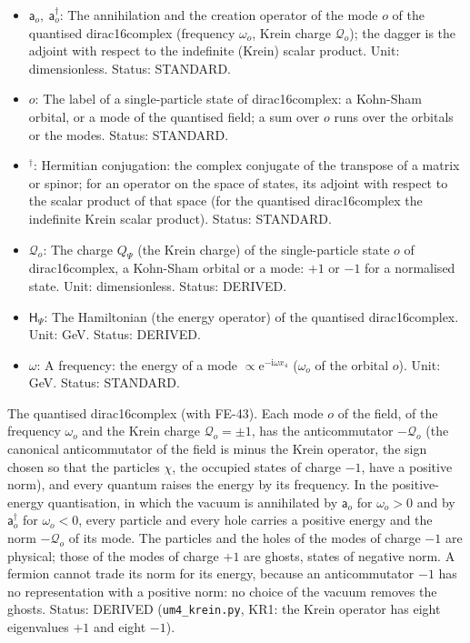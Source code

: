\documentclass[
  10pt,
]{article}
\providecommand{\tightlist}{%
  \setlength{\itemsep}{0pt}\setlength{\parskip}{0pt}}
\begin{document}
\begin{itemize}
\tightlist
\item
  \(\mathsf{a}_o,\ \mathsf{a}_o^\dagger\): The annihilation and the
  creation operator of the mode \(o\) of the quantised dirac16complex
  (frequency \(\omega_o\), Krein charge \(\mathcal{Q}_o\)); the dagger
  is the adjoint with respect to the indefinite (Krein) scalar product.
  Unit: dimensionless. Status: STANDARD.
\item
  \(o\): The label of a single-particle state of dirac16complex: a
  Kohn-Sham orbital, or a mode of the quantised field; a sum over \(o\)
  runs over the orbitals or the modes. Status: STANDARD.
\item
  \({}^\dagger\): Hermitian conjugation: the complex conjugate of the
  transpose of a matrix or spinor; for an operator on the space of
  states, its adjoint with respect to the scalar product of that space
  (for the quantised dirac16complex the indefinite Krein scalar
  product). Status: STANDARD.
\item
  \(\mathcal{Q}_o\): The charge \(Q_\Psi\) (the Krein charge) of the
  single-particle state \(o\) of dirac16complex, a Kohn-Sham orbital or
  a mode: \(+1\) or \(-1\) for a normalised state. Unit: dimensionless.
  Status: DERIVED.
\item
  \(\mathsf{H}_\Psi\): The Hamiltonian (the energy operator) of the
  quantised dirac16complex. Unit: GeV. Status: DERIVED.
\item
  \(\omega\): A frequency: the energy of a mode
  \(\propto \mathrm{e}^{-\mathrm{i}\omega x_4}\) (\(\omega_o\) of the
  orbital \(o\)). Unit: GeV. Status: STANDARD.
\end{itemize}

The quantised dirac16complex (with FE-43). Each mode \(o\) of the field,
of the frequency \(\omega_o\) and the Krein charge
\(\mathcal{Q}_o = \pm1\), has the anticommutator \(-\mathcal{Q}_o\) (the
canonical anticommutator of the field is minus the Krein operator, the
sign chosen so that the particles \(\chi\), the occupied states of
charge \(-1\), have a positive norm), and every quantum raises the
energy by its frequency. In the positive-energy quantisation, in which
the vacuum is annihilated by \(\mathsf{a}_o\) for \(\omega_o > 0\) and
by \(\mathsf{a}_o^\dagger\) for \(\omega_o < 0\), every particle and
every hole carries a positive energy and the norm \(-\mathcal{Q}_o\) of
its mode. The particles and the holes of the modes of charge \(-1\) are
physical; those of the modes of charge \(+1\) are ghosts, states of
negative norm. A fermion cannot trade its norm for its energy, because
an anticommutator \(-1\) has no representation with a positive norm: no
choice of the vacuum removes the ghosts. Status: DERIVED
(\texttt{um4\_krein.py}, KR1: the Krein operator has eight eigenvalues
\(+1\) and eight \(-1\)).
\end{document}

